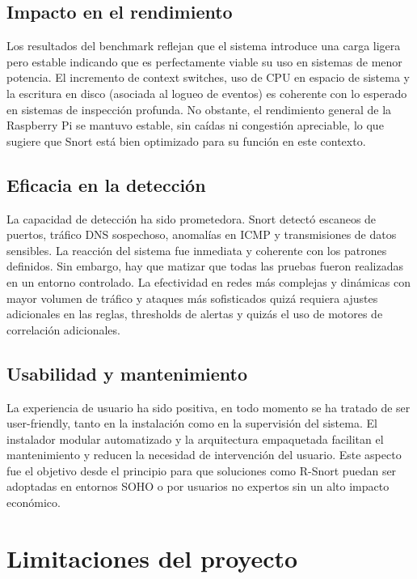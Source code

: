 \documentclass[11pt,a4paper,twoside]{report}
\begin{document}
\subsection{Impacto en el rendimiento}

Los resultados del benchmark reflejan que el sistema introduce una carga ligera pero estable indicando que es perfectamente viable su uso en sistemas de menor potencia. El incremento de context switches, uso de CPU en espacio de sistema y la escritura en disco (asociada al logueo de eventos) es coherente con lo esperado en sistemas de inspección profunda. No obstante, el rendimiento general de la Raspberry Pi se mantuvo estable, sin caídas ni congestión apreciable, lo que sugiere que Snort está bien optimizado para su función en este contexto.

\subsection{Eficacia en la detección}

La capacidad de detección ha sido prometedora. Snort detectó escaneos de puertos, tráfico DNS sospechoso, anomalías en ICMP y transmisiones de datos sensibles. La reacción del sistema fue inmediata y coherente con los patrones definidos. Sin embargo, hay que matizar que todas las pruebas fueron realizadas en un entorno controlado. La efectividad en redes más complejas y dinámicas con mayor volumen de tráfico y ataques más sofisticados quizá requiera ajustes adicionales en las reglas, thresholds de alertas y quizás el uso de motores de correlación adicionales.

\subsection{Usabilidad y mantenimiento}

La experiencia de usuario ha sido positiva, en todo momento se ha tratado de ser user-friendly, tanto en la instalación como en la supervisión del sistema. El instalador modular automatizado y la arquitectura empaquetada facilitan el mantenimiento y reducen la necesidad de intervención del usuario. Este aspecto fue el objetivo desde el principio para que soluciones como R-Snort puedan ser adoptadas en entornos SOHO o por usuarios no expertos sin un alto impacto económico.

\section{Limitaciones del proyecto}
\end{document}
